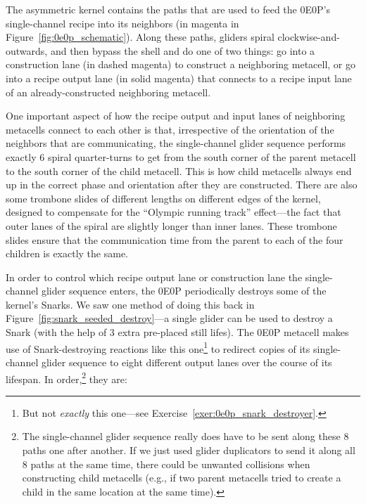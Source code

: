 The asymmetric kernel contains the paths that are used to feed the 0E0P's single-channel recipe into its neighbors (in magenta in Figure~\ref{fig:0e0p_schematic}). Along these paths, gliders spiral clockwise-and-outwards, and then bypass the shell and do one of two things: go into a construction lane (in dashed magenta) to construct a neighboring metacell, or go into a recipe output lane (in solid magenta) that connects to a recipe input lane of an already-constructed neighboring metacell.

One important aspect of how the recipe output and input lanes of neighboring metacells connect to each other is that, irrespective of the orientation of the neighbors that are communicating, the single-channel glider sequence performs exactly 6 spiral quarter-turns to get from the south corner of the parent metacell to the south corner of the child metacell. This is how child metacells always end up in the correct phase and orientation after they are constructed. There are also some trombone slides of different lengths on different edges of the kernel, designed to compensate for the ``Olympic running track'' effect---the fact that outer lanes of the spiral are slightly longer than inner lanes. These trombone slides ensure that the communication time from the parent to each of the four children is exactly the same.

In order to control which recipe output lane or construction lane the single-channel glider sequence enters, the 0E0P periodically destroys some of the kernel's Snarks. We saw one method of doing this back in Figure~\ref{fig:snark_seeded_destroy}---a single glider can be used to destroy a Snark (with the help of 3 extra pre-placed still lifes). The 0E0P metacell makes use of Snark-destroying reactions like this one\footnote{But not \emph{exactly} this one---see Exercise~\ref{exer:0e0p_snark_destroyer}.} to redirect copies of its single-channel glider sequence to eight different output lanes over the course of its lifespan. In order,\footnote{The single-channel glider sequence really does have to be sent along these $8$ paths one after another. If we just used glider duplicators to send it along all $8$ paths at the same time, there could be unwanted collisions when constructing child metacells (e.g., if two parent metacells tried to create a child in the same location at the same time).} they are:\smallskip

